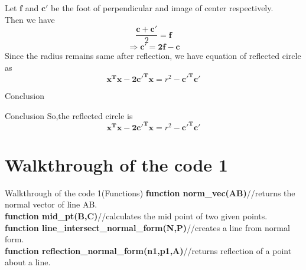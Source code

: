 \documentclass{beamer}
\begin{document}
\begin{frame}
\begin{solution}
Let $\boldsymbol{f}$ and $\boldsymbol{c'}$ be the foot of perpendicular and image of center respectively.\\
Then we have 
\begin{equation}
    \frac{\boldsymbol{c+c'}}{2} = \boldsymbol{f}
\end{equation}
\begin{equation}
    \Rightarrow \boldsymbol{c' = 2f - c}
\end{equation}
Since the radius remains same after reflection, we have equation of reflected circle as 
\begin{equation}
    \boldsymbol{x^Tx - 2c'^Tx} = r^2 - \boldsymbol{c'^Tc'}
\end{equation}
\end{solution}
\end{frame}

\begin{frame}{Conclusion}
\begin{block}{Conclusion}
So,the reflected circle is\\
\begin{equation}
    \boldsymbol{x^Tx - 2c'^Tx} = r^2 - \boldsymbol{c'^Tc'}
\end{equation}
\end{block}
\end{frame}


\section{ Walkthrough of the code 1}

\begin{frame}{Walkthrough of the code 1(Functions)}
\textbf{function norm\_vec(AB)}\hfill //returns the normal vector of line AB.\\
\textbf{function mid\_pt(B,C)}\hfill //calculates the mid point of two given points.\\
\textbf{function line\_intersect\_normal\_form(N,P)}\hfill //creates a line from normal form.\\
\textbf{function reflection\_normal\_form(n1,p1,A)}\hfill //returns reflection of a point about a line.\\
\end{frame}
\end{document}
